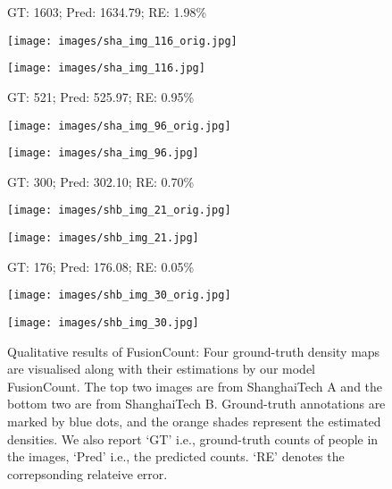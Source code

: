\documentclass{article}
\begin{document}
\begin{figure}[H]
\centerline{GT: 1603; Pred: 1634.79; RE: 1.98\%} \medskip
\vspace{-0.5em}
\begin{minipage}[t]{0.49\linewidth}
    \centering
    \centerline{\texttt{[image: images/sha\_img\_116\_orig.jpg]}}
\end{minipage}
\hfill
\begin{minipage}[t]{0.49\linewidth}
    \centering
    \centerline{\texttt{[image: images/sha\_img\_116.jpg]}}
\end{minipage}
\centerline{GT: 521; Pred: 525.97; RE: 0.95\%} \medskip
\begin{minipage}[t]{0.49\linewidth}
    \centering
    \centerline{\texttt{[image: images/sha\_img\_96\_orig.jpg]}}
\end{minipage}
\hfill
\begin{minipage}[t]{0.49\linewidth}
    \centering
    \centerline{\texttt{[image: images/sha\_img\_96.jpg]}}
\end{minipage}
\centerline{GT: 300; Pred: 302.10; RE: 0.70\%} \medskip
\vspace{-0.5em}
\begin{minipage}[t]{0.49\linewidth}
    \centering
    \centerline{\texttt{[image: images/shb\_img\_21\_orig.jpg]}}
\end{minipage}
\hfill
\begin{minipage}[t]{0.49\linewidth}
    \centering
    \centerline{\texttt{[image: images/shb\_img\_21.jpg]}}
\end{minipage}
\centerline{GT: 176; Pred: 176.08; RE: 0.05\%} \medskip
\begin{minipage}[t]{0.49\linewidth}
    \centering
    \centerline{\texttt{[image: images/shb\_img\_30\_orig.jpg]}}
\end{minipage}
\hfill
\begin{minipage}[t]{0.49\linewidth}
    \centering
    \centerline{\texttt{[image: images/shb\_img\_30.jpg]}}
\end{minipage}
\caption{Qualitative results of FusionCount: Four ground-truth density maps are visualised along with their estimations by our model FusionCount. The top two images are from ShanghaiTech A and the bottom two are from ShanghaiTech B. Ground-truth annotations are marked by \textcolor{NavyBlue}{blue} dots, and the \textcolor{YellowOrange}{orange} shades represent the estimated densities. We also report `GT' i.e., ground-truth counts of people in the images, `Pred' i.e., the predicted counts. `RE' denotes the correpsonding relateive error.}
\label{fig:shab_vis}
\end{figure}
\end{document}
